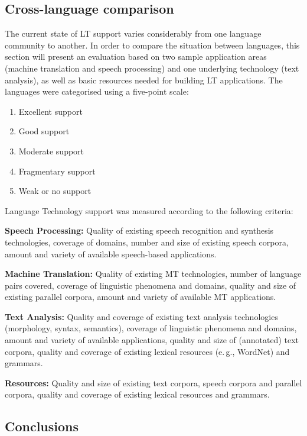 \begin{multicols}{2}
  \subsection{Cross-language comparison}

  The current state of LT support varies considerably from one language community to another. In order to compare the situation between languages, this section will present an evaluation based on two sample application areas (machine translation and speech processing) and one underlying technology (text analysis), as well as basic resources needed for building LT applications. The languages were categorised using a five-point scale: 

  \begin{enumerate}
  \item Excellent support
  \item Good support
  \item Moderate support
  \item Fragmentary support
  \item Weak or no support
  \end{enumerate}

  Language Technology support was measured according to the following criteria:

  \textbf{Speech Processing:} Quality of existing speech recognition and synthesis technologies, coverage of domains, number and size of existing speech corpora, amount and variety of available speech-based applications.

  \textbf{Machine Translation:} Quality of existing MT technologies, number of language pairs covered, coverage of linguistic phenomena and domains, quality and size of existing parallel corpora, amount and variety of available MT applications.

  \textbf{Text Analysis:} Quality and coverage of existing text analysis technologies (morphology, syntax, semantics), coverage of linguistic phenomena and domains, amount and variety of available applications, quality and size of (annotated) text corpora, quality and coverage of existing lexical resources (e.\,g., WordNet) and grammars.

  \textbf{Resources:} Quality and size of existing text corpora, speech corpora and parallel corpora, quality and coverage of existing lexical resources and grammars.
\vspace*{-9mm}

  \subsection{Conclusions}


\end{multicols}
